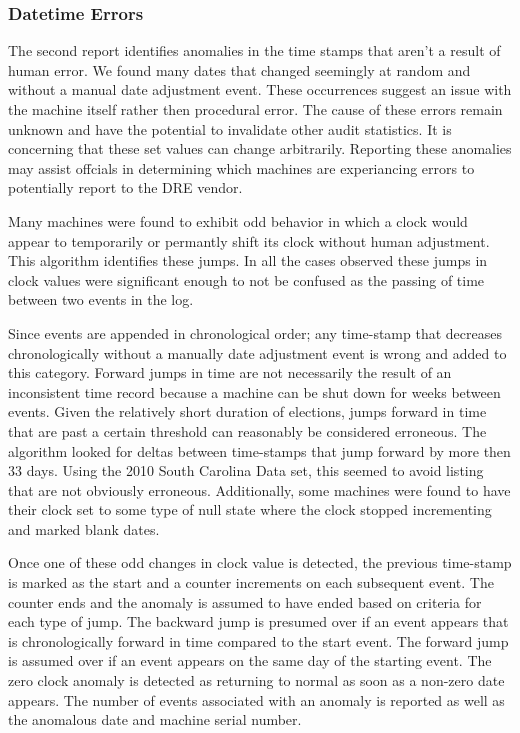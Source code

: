 \subsubsection{Datetime Errors}
The second report identifies anomalies in the time stamps that aren't a result of human error. We found many dates that changed seemingly at random and without a manual date adjustment event. These occurrences suggest an issue with the machine itself rather then procedural error. The cause of these errors remain unknown and have the potential to invalidate other audit statistics. It is concerning that these set values can change arbitrarily. Reporting these anomalies may assist offcials in determining which machines are experiancing errors to potentially report to the DRE vendor.

Many machines were found to exhibit odd behavior in which a clock would appear to temporarily or permantly shift its clock without human adjustment. This algorithm identifies these jumps.  In all the cases observed these jumps in clock values were significant enough to not be confused as the passing of time between two events in the log. 

Since events are appended in chronological order; any time-stamp that decreases chronologically without a manually date adjustment event is wrong and added to this category. Forward jumps in time are not necessarily the result of an inconsistent time record because a machine can be shut down for weeks between events.  Given the relatively short duration of elections, jumps forward in time that are past a certain threshold can reasonably be considered erroneous. The algorithm looked for deltas between time-stamps that jump forward by more then 33 days.  Using the 2010 South Carolina Data set, this seemed to avoid listing that are not obviously erroneous. Additionally, some machines were found to have their clock set to some type of null state where the clock stopped incrementing and marked blank dates. 

Once one of these odd changes in clock value is detected, the previous time-stamp is marked as the start and a counter increments on each subsequent event.  The counter ends and the anomaly is assumed to have ended based on criteria for each type of jump. The backward jump is presumed over if an event appears that is chronologically forward in time compared to the start event.  The forward jump is assumed over if an event appears on the same day of the starting event.  The zero clock anomaly is detected as returning to normal as soon as a non-zero date appears. The number of events associated with an anomaly is reported as well as the anomalous date and machine serial number. 

